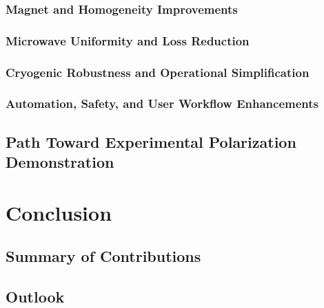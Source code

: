 \documentclass[FM,DP,EN,twoside]{tulthesis}
\begin{document}
\subsection{Magnet and Homogeneity Improvements}
\label{subsec:magnet-improvements}
\subsection{Microwave Uniformity and Loss Reduction}
\label{subsec:mw-improvements}
\subsection{Cryogenic Robustness and Operational Simplification}
\label{subsec:cryogenic-improvements}
\subsection{Automation, Safety, and User Workflow Enhancements}
\label{subsec:automation-improvements}
\section{Path Toward Experimental Polarization Demonstration}
\label{sec:path-toward-polarization-demonstration}

\chapter{Conclusion}
\label{sec:conclusion}
\section{Summary of Contributions}
\label{sec:summary-of-contributions}
\section{Outlook}
\label{sec:outlook}



\printbibliography
\end{document}
